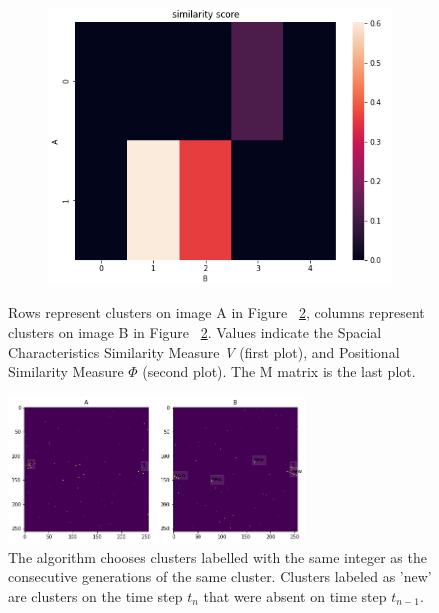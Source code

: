 \begin{figure}[H]
\begin{subfigure}[H]{0.51\textwidth}
    \centering
\includegraphics[width=\linewidth]{figures/chapter4/velopix_clusters/similarity.png}
\end{subfigure}
\caption{Rows represent clusters on image A in Figure ~\ref{fig:fin_clus}, columns represent clusters on image B in Figure ~\ref{fig:fin_clus}. Values indicate the Spacial Characteristics Similarity Measure \textit{V} (first plot), and Positional Similarity Measure \textit{$\Phi$} (second plot). The M matrix is the last plot.
}
\label{fig:sims}
\end{figure}

\begin{figure}[H]
\centering
\includegraphics[width=0.7\textwidth]{figures/chapter4/velopix_clusters/paired.png}
\caption{The algorithm chooses clusters labelled with the same integer as the consecutive generations of the same cluster. Clusters labeled as 'new' are clusters on the time step $t_{n}$ that were absent on time step $t_{n-1}$.}
\label{fig:fin_clus}
\end{figure}

